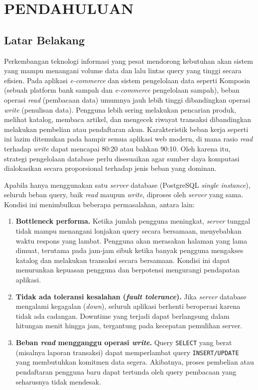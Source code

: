 \chapter{PENDAHULUAN}

\section{Latar Belakang}

Perkembangan teknologi informasi yang pesat mendorong kebutuhan akan
sistem yang mampu menangani volume data dan lalu lintas query yang
tinggi secara efisien. Pada aplikasi \textit{e-commerce} dan sistem
pengelolaan data seperti Komposin (sebuah platform bank sampah dan
\textit{e-commerce} pengelolaan sampah), beban operasi \textit{read}
(pembacaan data) umumnya jauh lebih tinggi dibandingkan operasi
\textit{write} (penulisan data). Pengguna lebih sering melakukan
pencarian produk, melihat katalog, membaca artikel, dan mengecek
riwayat transaksi dibandingkan melakukan pembelian atau pendaftaran
akun. Karakteristik beban kerja seperti ini lazim ditemukan pada
hampir semua aplikasi web modern, di mana rasio \textit{read} terhadap
\textit{write} dapat mencapai 80:20 atau bahkan 90:10. Oleh karena
itu, strategi pengelolaan database perlu disesuaikan agar sumber daya
komputasi dialokasikan secara proporsional terhadap jenis beban yang
dominan.

Apabila hanya menggunakan satu \textit{server} database (PostgreSQL
\textit{single instance}), seluruh beban query, baik \textit{read}
maupun \textit{write}, diproses oleh \textit{server} yang sama.
Kondisi ini menimbulkan beberapa permasalahan, antara lain:

\begin{enumerate}
    \item \textbf{Bottleneck performa.} Ketika jumlah pengguna
    meningkat, \textit{server} tunggal tidak mampu menangani lonjakan
    query secara bersamaan, menyebabkan waktu respons yang lambat.
    Pengguna akan merasakan halaman yang lama dimuat, terutama pada
    jam-jam sibuk ketika banyak pengguna mengakses katalog dan
    melakukan transaksi secara bersamaan. Kondisi ini dapat menurunkan
    kepuasan pengguna dan berpotensi mengurangi pendapatan aplikasi.
    \item \textbf{Tidak ada toleransi kesalahan (\textit{fault
    tolerance}).} Jika \textit{server} database mengalami kegagalan
    (\textit{down}), seluruh aplikasi berhenti beroperasi karena tidak
    ada cadangan. Downtime yang terjadi dapat berlangsung dalam hitungan
    menit hingga jam, tergantung pada kecepatan pemulihan server.
    \item \textbf{Beban \textit{read} mengganggu operasi
    \textit{write}.} Query \texttt{SELECT} yang berat (misalnya laporan
    transaksi) dapat memperlambat query \texttt{INSERT/UPDATE} yang
    membutuhkan komitmen data segera. Akibatnya, proses pembelian atau
    pendaftaran pengguna baru dapat tertunda oleh query pembacaan yang
    seharusnya tidak mendesak.
\end{enumerate}

